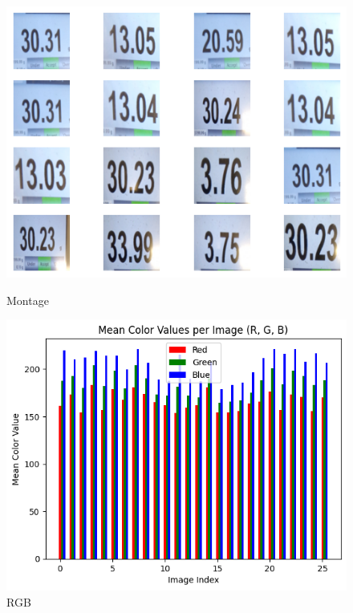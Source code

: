 \begin{figure}[ht]
    \centering
    \begin{minipage}[t]{0.25\textwidth}
        \centering
        \includegraphics[width=\textwidth]{Figures/EDA_Charts/3/montage.png}
        \caption*{Montage}
    \end{minipage}\hfill
    \begin{minipage}[t]{0.25\textwidth}
        \centering
        \includegraphics[width=\textwidth]{Figures/EDA_Charts/3/rgb.png}
        \caption*{RGB}
    \end{minipage}\hfill
    \begin{minipage}[t]{0.50\textwidth}

\end{minipage}
\end{figure}
